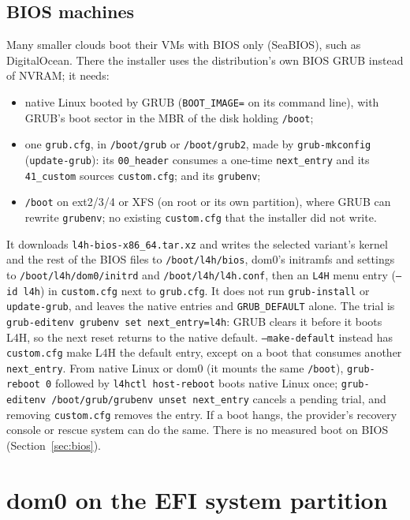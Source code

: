 \documentclass[11pt,a4paper]{report}
\newcommand{\cmd}[1]{\texttt{#1}}
\newcommand{\file}[1]{\texttt{#1}}
\begin{document}
\subsection*{BIOS machines}

Many smaller clouds boot their VMs with BIOS only (SeaBIOS), such as
DigitalOcean. There the installer uses the distribution's own BIOS GRUB
instead of NVRAM; it needs:
\begin{itemize}
  \item native Linux booted by GRUB (\texttt{BOOT\_IMAGE=} on its command
        line), with GRUB's boot sector in the MBR of the disk holding
        \file{/boot};
  \item one \file{grub.cfg}, in \file{/boot/grub} or \file{/boot/grub2},
        made by \cmd{grub-mkconfig} (\cmd{update-grub}): its
        \texttt{00\_header} consumes a one-time \texttt{next\_entry}
        and its \texttt{41\_custom} sources \file{custom.cfg}; and its
        \file{grubenv};
  \item \file{/boot} on ext2/3/4 or XFS (on root or its own partition),
        where GRUB can rewrite \file{grubenv}; no existing
        \file{custom.cfg} that the installer did not write.
\end{itemize}
It downloads \file{l4h-bios-x86\_64.tar.xz} and writes the selected
variant's kernel and the rest of the BIOS files to \file{/boot/l4h/bios},
dom0's initramfs and settings to \file{/boot/l4h/dom0/initrd} and
\file{/boot/l4h/l4h.conf}, then an \texttt{L4H} menu entry
(\texttt{--id l4h}) in \file{custom.cfg} next to \file{grub.cfg}. It does
not run \cmd{grub-install} or \cmd{update-grub}, and leaves the native
entries and \texttt{GRUB\_DEFAULT} alone. The trial is
\cmd{grub-editenv grubenv set next\_entry=l4h}: GRUB clears it before it
boots L4H, so the next reset returns to the native default.
\texttt{--make-default} instead has \file{custom.cfg} make L4H the default
entry, except on a boot that consumes another \texttt{next\_entry}. From
native Linux or dom0 (it mounts the same \file{/boot}),
\cmd{grub-reboot 0} followed by \cmd{l4hctl host-reboot} boots native
Linux once; \cmd{grub-editenv /boot/grub/grubenv unset next\_entry}
cancels a pending trial, and removing \file{custom.cfg} removes the entry.
If a boot hangs, the provider's recovery console or rescue system can do
the same. There is no measured boot on BIOS (Section~\ref{sec:bios}).

\section{dom0 on the EFI system partition}
\label{sec:esp}
\end{document}
